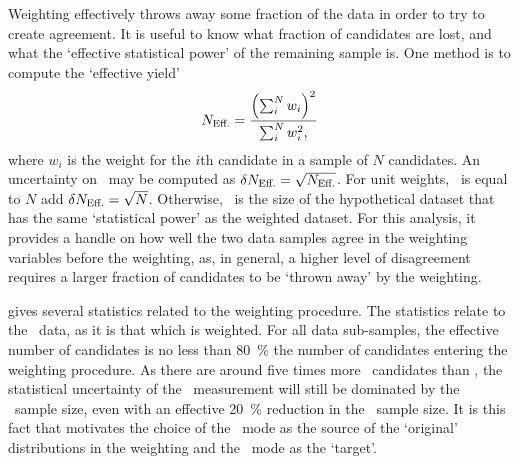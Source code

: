 Weighting effectively throws away some fraction of the data in order to try to 
create agreement.
It is useful to know what fraction of candidates are lost, and what the 
`effective statistical power' of the remaining sample is.
One method is to compute the `effective yield'
\begin{equation}
  \neff = \frac{%
    {\left(\sum_{i}^{N}{w_{i}}\right)}^{2}
  }{%
    \sum_{i}^{N}{w_{i}^{2}},
  }
\end{equation}
where $w_{i}$ is the weight for the $i$th candidate in a sample of $N$ 
candidates.
An uncertainty on \neff\ may be computed as $\delta{\ensuremath{N_{\text{Eff.}}}} = \sqrt{N_{\text{Eff.}}}$.
For unit weights, \neff\ is equal to $N$ add $\delta{\ensuremath{N_{\text{Eff.}}}} = \sqrt{N}$.
Otherwise, \neff\ is the size of the hypothetical dataset that has the same 
`statistical power' as the weighted dataset.
For this analysis, it provides a handle on how well the two data samples agree 
in the weighting variables before the weighting, as, in general, a higher level 
of disagreement requires a larger fraction of candidates to be `thrown away' by 
the weighting.

 gives several statistics 
related to the weighting procedure.
The statistics relate to the \ppipi\ data, as it is that which is weighted.
For all data sub-samples, the effective number of candidates is no less than 
\SI{80}{\percent} the number of candidates entering the weighting procedure.
As there are around five times more \ppipi\ candidates than \pKK, the 
statistical uncertainty of the \dACP\ measurement will still be dominated by 
the \pKK\ sample size, even with an effective \SI{20}{\percent} reduction in 
the \ppipi\ sample size.
It is this fact that motivates the choice of the \ppipi\ mode as the source of 
the `original' distributions in the weighting and the \pKK\ mode as the 
`target'.

\begin{table}
  \centering
  \caption{%
    Statistics computed on the weighted \ppipi\ data for all data sub-samples 
    used in the analysis.
    The quantities are defined in 
    \cref{chap:cpv:kinematic_weighting:validation:stats}.
  }
  \label{tab:cpv:kinematic_weighting:validation:stats}
    
\end{table}


